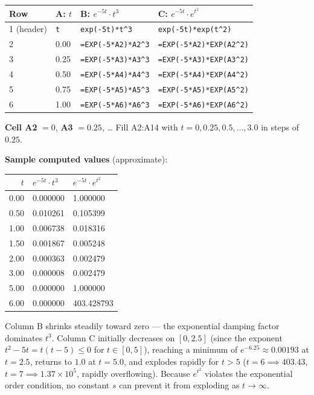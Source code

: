 \documentclass[12pt,a4paper]{article}
\begin{document}
\medskip
\begin{center}
\begin{tabular}{@{}llll@{}}
\toprule
\textbf{Row} & \textbf{A: $t$} &
\textbf{B: $e^{-5t} \cdot t^3$} &
\textbf{C: $e^{-5t} \cdot e^{t^2}$} \\
\midrule
1 (header) & \texttt{t} & \texttt{exp(-5t)*t\^{}3} & \texttt{exp(-5t)*exp(t\^{}2)} \\
2 & 0.00 & \texttt{=EXP(-5*A2)*A2\^{}3} & \texttt{=EXP(-5*A2)*EXP(A2\^{}2)} \\
3 & 0.25 & \texttt{=EXP(-5*A3)*A3\^{}3} & \texttt{=EXP(-5*A3)*EXP(A3\^{}2)} \\
4 & 0.50 & \texttt{=EXP(-5*A4)*A4\^{}3} & \texttt{=EXP(-5*A4)*EXP(A4\^{}2)} \\
5 & 0.75 & \texttt{=EXP(-5*A5)*A5\^{}3} & \texttt{=EXP(-5*A5)*EXP(A5\^{}2)} \\
6 & 1.00 & \texttt{=EXP(-5*A6)*A6\^{}3} & \texttt{=EXP(-5*A6)*EXP(A6\^{}2)} \\
\bottomrule
\end{tabular}
\end{center}

\medskip
\noindent\textbf{Cell A2} $= 0$, \textbf{A3} $= 0.25$, \ldots
Fill A2:A14 with $t = 0, 0.25, 0.5, \ldots, 3.0$ in steps of $0.25$.

\medskip
\noindent\textbf{Sample computed values} (approximate):

\medskip
\begin{center}
\begin{tabular}{@{}rll@{}}
\toprule
$t$ & $e^{-5t} \cdot t^3$ & $e^{-5t} \cdot e^{t^2}$ \\
\midrule
0.00  & 0.000000       & 1.000000   \\
0.50  & 0.010261       & 0.105399   \\
1.00  & 0.006738       & 0.018316   \\
1.50  & 0.001867       & 0.005248   \\
2.00  & 0.000363       & 0.002479   \\
3.00  & 0.000008       & 0.002479   \\
5.00  & 0.000000       & 1.000000   \\
6.00  & 0.000000       & 403.428793 \\
\bottomrule
\end{tabular}
\end{center}

\medskip
Column B shrinks steadily toward zero --- the exponential damping factor dominates $t^3$.
Column C initially decreases on $[0, 2.5]$ (since the exponent $t^2 - 5t = t(t-5) \le 0$ for $t \in [0, 5]$), reaching a minimum of $e^{-6.25} \approx 0.00193$ at $t = 2.5$, returns to $1.0$ at $t = 5.0$, and explodes rapidly for $t > 5$ ($t = 6 \implies 403.43$, $t = 7 \implies 1.37 \times 10^5$, rapidly overflowing). Because $e^{t^2}$ violates the exponential order condition, no constant $s$ can prevent it from exploding as $t \to \infty$.
\end{document}
